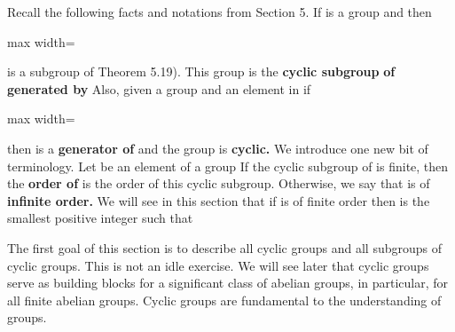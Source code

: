 \documentclass[11pt,oneside]{article}
\begin{document}
\fi
\renewcommand{\BookFooter}{Section 6 Cyclic Groups}
\ifdefined\BookMaster\else\setcounter{page}{61}\fi
\BookNarrativetrue

\begin{BookBody}


\noindent Recall the following facts and notations from Section 5. If  is a group and  then

\begin{center}\begin{adjustbox}{max width=\linewidth}\end{adjustbox}\end{center}

\noindent is a subgroup of Theorem 5.19). This group is the\textbf{ cyclic subgroup}  \textbf{of}  \textbf{gener}\textbf{ated by}  Also, given a group  and an element  in  if

\begin{center}\begin{adjustbox}{max width=\linewidth}\end{adjustbox}\end{center}

\noindent then  is a\textbf{ generator of}  and the group  is\textbf{ cyclic.} We introduce one new bit of terminology. Let  be an element of a group  If the cyclic subgroup  of  is finite, then the\textbf{ order of}  is the order  of this cyclic subgroup. Otherwise, we say that  is of\textbf{ infinite order.} We will see in this section that if  is of finite order  then  is the smallest positive integer such that 

The first goal of this section is to describe all cyclic groups and all subgroups of cyclic groups. This is not an idle exercise. We will see later that cyclic groups serve as building blocks for a significant class of abelian groups, in particular, for all finite abelian groups. Cyclic groups are fundamental to the understanding of groups.


\end{BookBody}
\end{document}
